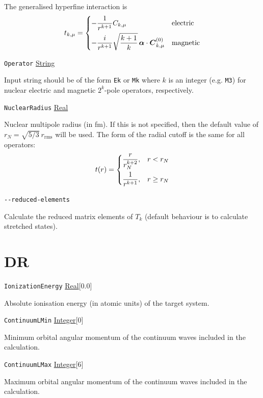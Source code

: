 \documentclass{report}
\begin{document}
The generalised hyperfine interaction is
\[
t_{k,\mu} = \begin{dcases}
-\frac{1}{r^{k+1}}C_{k,\mu} & \textrm{electric} \\
-\frac{i}{r^{k+1}}\sqrt{\frac{k+1}{k}}\, \boldsymbol{\alpha}\cdot\boldsymbol{C}^{(0)}_{k,\mu} & \textrm{magnetic}
\end{dcases}
\]

\texttt{Operator} \uline{String}
\begin{adjustwidth}{1cm}{}
Input string should be of the form \texttt{Ek} or \texttt{Mk} where $k$ is an integer (e.g. \texttt{M3}) for nuclear electric and magnetic $2^k$-pole operators, respectively.
\end{adjustwidth}

\texttt{NuclearRadius} \uline{Real}
\begin{adjustwidth}{1cm}{}
Nuclear multipole radius (in fm). If this is not specified, then the default value of $r_N = \sqrt{5/3} ~ r_{\textrm{rms}}$ will be used. The form of the radial cutoff is the same for all operators:
\[
t(r) = \begin{dcases}
\frac{r}{r_N^{k+2}}, & r < r_N \\
\frac{1}{r^{k+1}}, & r \geq r_N \\
\end{dcases}
\]
\end{adjustwidth}

\texttt{{-}{-}reduced-elements} 
\begin{adjustwidth}{1cm}{}
	Calculate the reduced matrix elements of $T_k$ (default behaviour is to calculate stretched states).
\end{adjustwidth}
\section{DR} %

\texttt{IonizationEnergy} \uline{Real}[0.0]
\begin{adjustwidth}{1cm}{}
Absolute ionisation energy (in atomic units) of the target system.
\end{adjustwidth}

\texttt{ContinuumLMin} \uline{Integer}[0]
\begin{adjustwidth}{1cm}{}
Minimum orbital angular momentum of the continuum waves included in the calculation. 
\end{adjustwidth}

\texttt{ContinuumLMax} \uline{Integer}[6]
\begin{adjustwidth}{1cm}{}
Maximum orbital angular momentum of the continuum waves included in the calculation. 
\end{adjustwidth}
\end{document}
